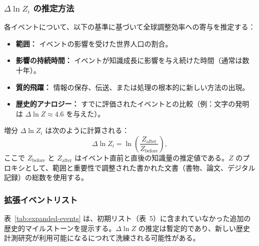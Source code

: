 \documentclass[12pt,a4paper]{article}
\theoremstyle{remark}
\begin{document}
	\subsubsection{\(\Delta \ln Z_i\) の推定方法}
	
	各イベントについて、以下の基準に基づいて全球調整効率への寄与を推定する：
	\begin{itemize}
		\item \textbf{範囲：} イベントの影響を受けた世界人口の割合。
		\item \textbf{影響の持続時間：} イベントが知識成長に影響を与え続けた時間（通常は数十年）。
		\item \textbf{質的飛躍：} 情報の保存、伝送、または処理の根本的に新しい方法の出現。
		\item \textbf{歴史的アナロジー：} すでに評価されたイベントとの比較（例：文字の発明は \(\Delta \ln Z \approx 4.6\) を与えた）。
	\end{itemize}
	増分 \(\Delta \ln Z_i\) は次のように計算される：
	\[
	\Delta \ln Z_i = \ln\left(\frac{Z_{\text{after}}}{Z_{\text{before}}}\right),
	\]
	ここで \(Z_{\text{before}}\) と \(Z_{\text{after}}\) はイベント直前と直後の知識量の推定値である。\(Z\) のプロキシとして、範囲と重要性で調整された書かれた文書（書物、論文、デジタル記録）の総数を使用する。
	
	\subsubsection{拡張イベントリスト}
	
	表~\ref{tab:expanded-events} は、初期リスト（表~5）に含まれていなかった追加の歴史的マイルストーンを提示する。\(\Delta \ln Z\) の推定は暫定的であり、新しい歴史計測研究が利用可能になるにつれて洗練される可能性がある。
	
\end{document}
